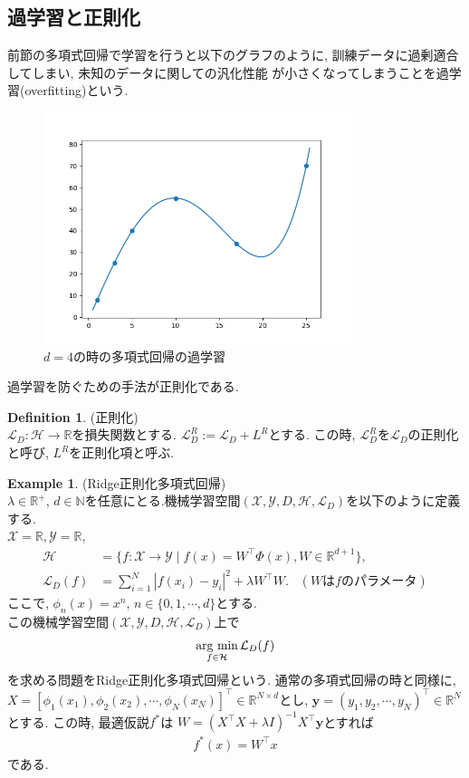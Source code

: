 \documentclass[11pt, a4paper, dvipdfmx]{jsarticle}
\theoremstyle{definition}
\newtheorem{Definition+}[Axiom+]{Definition}
\newtheorem{Example+}[Axiom+]{Example}
\newcommand{\N}{\mathbb{N}}
\newcommand{\R}{\mathbb{R}}
\newcommand{\X}{\mathcal{X}}
\newcommand{\Y}{\mathcal{Y}}
\newcommand{\Hil}{\mathcal{H}}
\newcommand{\Loss}{\mathcal{L}_{D}}
\newcommand{\MLsp}{(\X, \Y, D, \Hil, \Loss)}
\newcommand{\argmin}{\mathop{\rm arg~min}\limits}
\begin{document}
\subsection{過学習と正則化}
前節の多項式回帰で学習を行うと以下のグラフのように, 訓練データに過剰適合してしまい, 未知のデータに関しての汎化性能
が小さくなってしまうことを過学習(overfitting)という. 
\begin{figure}[H]
    \centering
    \includegraphics[width = 9.0cm]{Images/overfitting_PR.png}
    \caption{$d = 4$の時の多項式回帰の過学習}
\end{figure}
過学習を防ぐための手法が正則化である.
\begin{Definition+}(正則化)\\
    $\Loss:\Hil\to\R$を損失関数とする. $\Loss^{R} := \Loss + L^{R}$とする.
    この時, $\Loss^{R}$を$\Loss$の正則化と呼び, $L^R$を正則化項と呼ぶ.
\end{Definition+}
\begin{Example+}(Ridge正則化多項式回帰)\\
    $\lambda\in\R^{+}$, $d\in\N$を任意にとる.機械学習空間$\MLsp$を以下のように定義する.\\
    $\X = \R, \Y = \R$, 
    \begin{align*}
        \Hil &= \{f:\X\to\Y\mid f(x) = W^{\top}\Phi(x), W\in\R^{d + 1}\},\\
        \Loss(f) &= \sum_{i = 1}^{N}|f(x_i) - y_i|^2+\lambda W^\top W.\hspace{10pt}　(W\text{は$f$のパラメータ})
    \end{align*}
    ここで, $\phi_{n}(x) = x^{n}$, $n\in\{0, 1, \cdots, d\}$とする.\\
    この機械学習空間$\MLsp$上で
    \begin{align*}
        \argmin_{f\in\Hil}\Loss(f)
    \end{align*}
    を求める問題をRidge正則化多項式回帰という. 通常の多項式回帰の時と同様に, $X = [\phi_{1}(x_1), \phi_{2}(x_{2}), \cdots, \phi_{N}(x_N)]^{\top}\in\R^{N\times d}$とし, 
    $\mathbf{y} = (y_{1}, y_{2}, \cdots, y_{N})^{\top}\in\R^{N}$とする. この時, 最適仮説$f^{*}$は
    $W = (X^\top X + \lambda I)^{-1}X^\top\mathbf{y}$とすれば
    \begin{align*}
        f^{*}(x) = W^{\top}x
    \end{align*}
    である. 
\end{Example+}
\end{document}
